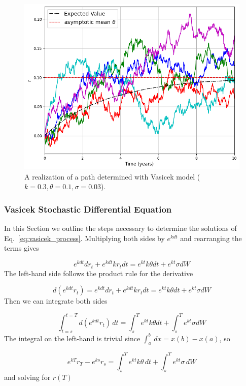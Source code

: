 \begin{figure}[htb]
  \centering
  \includegraphics[width=0.7\linewidth]{figures/vasicek_short_rate}
  \caption{A realization of a path determined with Vasicek model ($k=0.3, \theta=0.1, \sigma=0.03$).}
  \label{fig:vasicek_path}
\end{figure}

\subsubsection{Vasicek Stochastic Differential Equation}
\label{vasicek-stochastic-differential-equation}

In this Section we outline the steps necessary to determine the solutions of Eq.~\ref{eq:vasicek_process}.
Multiplying both sides by \(e^{kdt}\) and rearranging the terms gives

\begin{equation*}
e^{kdt}dr_t + e^{kdt}kr_t dt = e^{kt}k\theta dt + e^{kt}\sigma dW
\end{equation*}
The left-hand side follows the product rule for the derivative

\begin{equation*}
d(e^{kdt}r_t) = e^{kdt}dr_t + e^{kdt}kr_t dt= e^{kt}k\theta dt + e^{kt}\sigma dW
\end{equation*}
Then we can integrate both sides

\begin{equation*}
\int^{t=T}_{t=s} d(e^{kdt}r_t)\,dt = \int^T_s e^{kt}k\theta dt +\int^T_s e^{kt}\sigma dW
\end{equation*}
The integral on the left-hand is trivial since \(\int^b_a\,dx = x(b)-x(a)\), so

\begin{equation*}
e^{kT}r_T - e^{ks}r_s = \int^T_s e^{kt}k\theta\,dt +\int^T_s e^{kt}\sigma\,dW
\end{equation*}
and solving for $r(T)$


